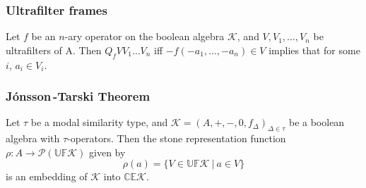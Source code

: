 \documentclass[10pt]{beamer}
\theoremstyle{definition}
\theoremstyle{definition}
\begin{document}
\begin{frame}
\frametitle{Ultrafilter frames}

\begin{lemma}
Let $f$ be an $n$-ary operator on the boolean algebra $\mathcal{K}$, and 
$V, V_1,\dots ,V_n$ be ultrafilters of A. Then
$Q_f VV_1\dots V_n$ iff $-f(-a_1,\dots ,-a_n) \in V$ implies that for some $i$, $a_i\in V_i$.
\end{lemma}



\end{frame}


\begin{frame}\label{frame: final theorem}

\frametitle{J\' onsson\,-Tarski Theorem}

\begin{theorem}
Let $\tau$ be a modal similarity type, and
$\mathcal{K} = (A, +, -, 0, f_{\Delta})_{\Delta \in \tau}$ be a boolean algebra with 
$\tau$-operators. Then the stone representation function 
$\rho : A \to \mathcal{P}(\mathbb{UF} \mathcal{K})$ given by
$$\rho(a) = \{V \in\mathbb{UF} \mathcal{K}\ |\ a \in V \}$$
is an embedding of $\mathcal{K}$ into $\mathbb{CE}\mathcal{K}$.
\end{theorem}

\end{frame}
\end{document}
